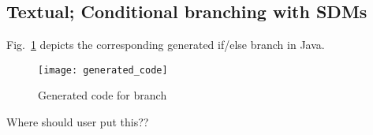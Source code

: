 \newpage
\subsection{Textual; Conditional branching with SDMs}
\texHeader
\hypertarget{conBran tex}{}

Fig.~\ref{fig:cond_branch_on_op_code} depicts the corresponding generated if/else branch in Java.

\begin{figure}[htp]
\begin{center}
  \texttt{[image: generated\_code]}
  \caption{Generated code for branch}
  \label{fig:cond_branch_on_op_code}
\end{center}
\end{figure}

Where should user put this??
